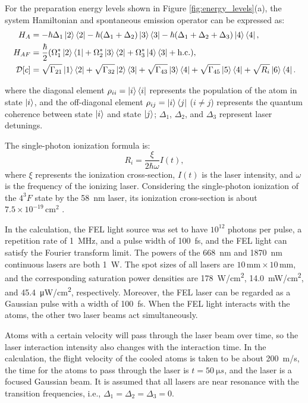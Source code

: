 \documentclass[12pt,a4paper]{article}
\begin{document}
For the preparation energy levels shown in Figure \ref{fig:energy_levels}(a), the system Hamiltonian and spontaneous emission operator can be expressed as:
\begin{align}
H_A &= -\hbar\Delta_1 \ket{2}\bra{2} - \hbar(\Delta_1 + \Delta_2) \ket{3}\bra{3} - \hbar(\Delta_1 + \Delta_2 + \Delta_3) \ket{4}\bra{4}, \\
H_{AF} &= \frac{\hbar}{2} (\Omega_1^* \ket{2}\bra{1} + \Omega_2^* \ket{3}\bra{2} + \Omega_3^* \ket{4}\bra{3} + \text{h.c.}), \\
\mathcal{D}[c] &= \sqrt{\Gamma_{21}} \ket{1}\bra{2} + \sqrt{\Gamma_{32}} \ket{2}\bra{3} + \sqrt{\Gamma_{43}} \ket{3}\bra{4} + \sqrt{\Gamma_{45}} \ket{5}\bra{4} + \sqrt{R_i} \ket{6}\bra{4}.
\end{align}

where the diagonal element $\rho_{ii} = \ket{i}\bra{i}$ represents the population of the atom in state $\ket{i}$, and the off-diagonal element $\rho_{ij} = \ket{i}\bra{j}$ ($i \neq j$) represents the quantum coherence between state $\ket{i}$ and state $\ket{j}$; $\Delta_1$, $\Delta_2$, and $\Delta_3$ represent laser detunings.

The single-photon ionization formula is:
\begin{equation}
R_i = \frac{\xi}{2\hbar\omega} I(t),
\end{equation}
where $\xi$ represents the ionization cross-section, $I(t)$ is the laser intensity, and $\omega$ is the frequency of the ionizing laser. Considering the single-photon ionization of the $4^3F$ state by the \SI{58}{nm} laser, its ionization cross-section is about $7.5 \times 10^{-19} \, \text{cm}^2$ \cite{ref14}.

In the calculation, the FEL light source was set to have $10^{12}$ photons per pulse, a repetition rate of \SI{1}{MHz}, and a pulse width of \SI{100}{fs}, and the FEL light can satisfy the Fourier transform limit. The powers of the \SI{668}{nm} and \SI{1870}{nm} continuous lasers are both \SI{1}{W}. The spot sizes of all lasers are $10 \, \text{mm} \times 10 \, \text{mm}$, and the corresponding saturation power densities are \SI{178}{W/cm^2}, \SI{14.0}{mW/cm^2}, and \SI{45.4}{\micro W/cm^2}, respectively. Moreover, the FEL laser can be regarded as a Gaussian pulse with a width of \SI{100}{fs}. When the FEL light interacts with the atoms, the other two laser beams act simultaneously.

Atoms with a certain velocity will pass through the laser beam over time, so the laser interaction intensity also changes with the interaction time. In the calculation, the flight velocity of the cooled atoms is taken to be about \SI{200}{m/s}, the time for the atoms to pass through the laser is $t = \SI{50}{\micro s}$, and the laser is a focused Gaussian beam. It is assumed that all lasers are near resonance with the transition frequencies, i.e., $\Delta_1 = \Delta_2 = \Delta_3 = 0$.
\end{document}

